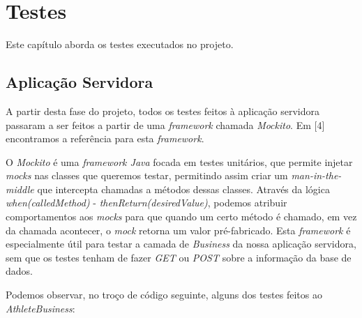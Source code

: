 %
%
%
\chapter{Testes} \label{testes}
Este capítulo aborda os testes executados no projeto.

\section{Aplicação Servidora} \label{sec51}
A partir desta fase do projeto, todos os testes feitos à aplicação servidora passaram a ser feitos a partir de uma \textit{framework} chamada \textit{Mockito}. Em [4] encontramos a referência para esta \textit{framework}. 

O \textit{Mockito} é uma \textit{framework Java} focada em testes unitários, que permite injetar \textit{mocks} nas classes que queremos testar, permitindo assim criar um \textit{man-in-the-middle} que intercepta chamadas a métodos dessas classes. Através da lógica \textit{when(calledMethod)} - \textit{thenReturn(desiredValue)}, podemos atribuir comportamentos aos \textit{mocks} para que quando um certo método é chamado, em vez da chamada acontecer, o \textit{mock} retorna um valor pré-fabricado. Esta \textit{framework} é especialmente útil para testar a camada de \textit{Business} da nossa aplicação servidora, sem que os testes tenham de fazer \textit{GET} ou \textit{POST} sobre a informação da base de dados.

Podemos observar, no troço de código seguinte, alguns dos testes feitos ao \textit{AthleteBusiness}:

